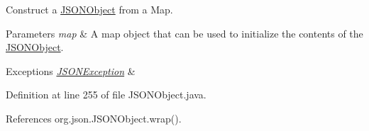 Construct a \hyperlink{classorg_1_1json_1_1_j_s_o_n_object}{J\-S\-O\-N\-Object} from a Map.


\begin{DoxyParams}{Parameters}
{\em map} & A map object that can be used to initialize the contents of the \hyperlink{classorg_1_1json_1_1_j_s_o_n_object}{J\-S\-O\-N\-Object}. \\
\hline
\end{DoxyParams}

\begin{DoxyExceptions}{Exceptions}
{\em \hyperlink{classorg_1_1json_1_1_j_s_o_n_exception}{J\-S\-O\-N\-Exception}} & \\
\hline
\end{DoxyExceptions}


Definition at line 255 of file J\-S\-O\-N\-Object.\-java.



References org.\-json.\-J\-S\-O\-N\-Object.\-wrap().


